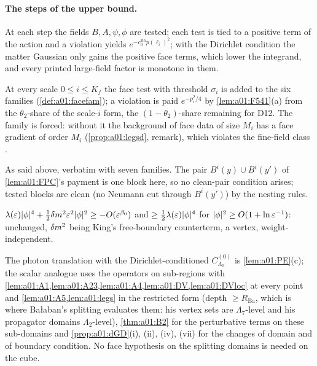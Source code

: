 \paragraph{The steps of the upper bound.}
\begin{description}[leftmargin=1.5em,style=nextline]
\item[{D1 (large/small split; \cite[(2.2)--(2.3)]{Ba2})}] At each step the fields $B,A,\psi,\phi$ are tested; each test is tied to a positive term of the action and a violation yields $e^{-c_0^{\mathrm{Ba}}p(\ell_i)^2}$; with the Dirichlet condition the matter Gaussian only gains the positive face terms, which lower the integrand, and every printed large-field factor is monotone in them.
\item[D2 (the face family)] At every scale $0\le i\le K_f$ the face test with threshold $\sigma_i$ is added to the six families (\cref{def:a01:facefam}); a violation is paid $e^{-p_i^2/4}$ by \cref{lem:a01:F541}(a) from the $\theta_2$-share of the scale-$i$ form, the $(1-\theta_2)$-share remaining for D12. The family is forced: without it the background of face data of size $M_i$ has a face gradient of order $M_i$ (\cref{prop:a01:legsd}, remark), which violates the fine-field class \cite[(2.55)]{Ba2}.
\item[{D3 (region geometry; \cite[(2.4)--(2.10), (2.43)]{Ba2})}] As said above, verbatim with seven families. The pair $B^i(y)\cup B^i(y')$ of \cref{lem:a01:FPC}'s payment is one block here, so no clean-pair condition arises; tested blocks are clean (no Neumann cut through $B^i(y')$) by the nesting rules.
\item[{D4 (scalar large fields; \cite[(2.11)--(2.13)]{Ba2})}] $\lambda(\varepsilon)|\phi|^4+\frac12\delta m^2\varepsilon^2|\phi|^2\ge-O(\varepsilon^{\beta_0})$ and $\ge\frac12\lambda(\varepsilon)|\phi|^4$ for $|\phi|^2\ge O(1+\ln\varepsilon^{-1})$: unchanged, $\delta m^2$ being King's free-boundary counterterm, a vertex, weight-independent.
\item[{D5 (translation and splitting; \cite[(2.18)--(2.19)]{Ba2})}] The photon translation with the Dirichlet-conditioned $C^{(0)}_{\Lambda_0}$ is \cref{lem:a01:PE}(c); the scalar analogue uses the operators on sub-regions with \cref{lem:a01:A1,lem:a01:A23,lem:a01:A4,lem:a01:DV,lem:a01:DVloc} at every point and \cref{lem:a01:A5,lem:a01:legs} in the restricted form (depth $\ge R_{\mathrm{Ba}}$, which is where Ba{\l}aban's splitting evaluates them: his vertex sets are $\Lambda_7$-level and his propagator domains $\Lambda_2$-level), \cref{thm:a01:B2} for the perturbative terms on these sub-domains and \cref{prop:a01:dGD}(i), (ii), (iv), (vii) for the changes of domain and of boundary condition. No face hypothesis on the splitting domains is needed on the cube.

\end{description}

